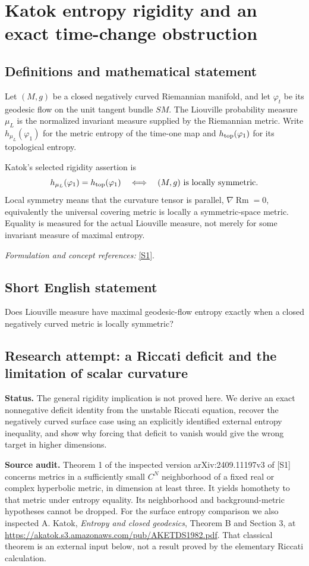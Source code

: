 \documentclass[11pt]{article}
\begin{document}
\section*{\texorpdfstring{Katok entropy rigidity and an exact time-change obstruction}{Katok entropy rigidity and an exact time-change obstruction}}\label{statement}
\subsection{Definitions and mathematical statement}
Let $(M,g)$ be a closed negatively curved Riemannian manifold, and let $\varphi_t$ be its geodesic flow on the unit tangent bundle $SM$. The Liouville probability measure $\mu_L$ is the normalized invariant measure supplied by the Riemannian metric. Write $h_{\mu_L}(\varphi_1)$ for the metric entropy of the time-one map and $h_{\rm top}(\varphi_1)$ for its topological entropy.

Katok's selected rigidity assertion is
\[
 h_{\mu_L}(\varphi_1)=h_{\rm top}(\varphi_1)
 \quad\Longleftrightarrow\quad (M,g)\text{ is locally symmetric}.
\]
Local symmetry means that the curvature tensor is parallel, $\nabla\operatorname{Rm}=0$, equivalently the universal covering metric is locally a symmetric-space metric. Equality is measured for the actual Liouville measure, not merely for some invariant measure of maximal entropy.
\par\smallskip\textit{Formulation and concept references:} \href{https://arxiv.org/abs/2409.11197}{[S1]}.

\subsection{Short English statement}
Does Liouville measure have maximal geodesic-flow entropy exactly when a closed negatively curved metric is locally symmetric?
\subsection{Research attempt: a Riccati deficit and the limitation of scalar curvature}
\textbf{Status.} The general rigidity implication is not proved here. We derive an exact nonnegative deficit identity from the unstable Riccati equation, recover the negatively curved surface case using an explicitly identified external entropy inequality, and show why forcing that deficit to vanish would give the wrong target in higher dimensions.

\textbf{Source audit.} Theorem 1 of the inspected version arXiv:2409.11197v3 of [S1] concerns metrics in a sufficiently small $C^N$ neighborhood of a fixed real or complex hyperbolic metric, in dimension at least three. It yields homothety to that metric under entropy equality. Its neighborhood and background-metric hypotheses cannot be dropped. For the surface entropy comparison we also inspected A. Katok, \emph{Entropy and closed geodesics}, Theorem B and Section 3, at \url{https://akatok.s3.amazonaws.com/pub/AKETDS1982.pdf}. That classical theorem is an external input below, not a result proved by the elementary Riccati calculation.
\end{document}
